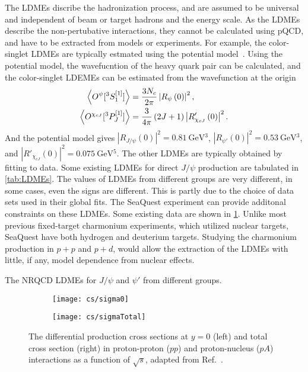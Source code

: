 \documentclass[../main.tex]{subfiles}
\begin{document}
The LDMEs discribe the hadronization process,
and are assumed to be universal and independent of beam or target hadrons and the energy scale.
As the LDMEs describe the non-pertubative interactions,
they cannot be calculated using pQCD, and have to be extracted from models or experiments.
For example, the color-singlet LDMEs are typically estmated using the potential model~\cite{eichten1995}.
Using the potential model, the wavefucntion of the heavy quark pair can be calculated, 
and the color-singlet LDEMEs can be estimated from the wavefunction at the origin
\begin{equation}
	\begin{split}
		\expval{O^{\psi}[^3S_1^{\left[1\right]}]} &= \frac{3N_c}{2\pi} \left| R_{\psi}\left(0\right)\right|^2,\\
		\expval{O^{\chi_{cJ}}[^3P_J^{\left[1\right]}]} &= \frac{3}{4\pi}\left(2J+1\right) \left| R'_{\chi_{cJ}}\left(0\right)\right|^2.
	\end{split}
\end{equation}
And the potential model gives $\left|R_{J/\psi}\left(0\right)\right|^2=\SI{0.81}{\GeV^3}$,
$\left|R_{\psi'}\left(0\right)\right|^2=\SI{0.53}{\GeV^3}$, and $\left|R'_{\chi_{cJ}}\left(0\right)\right|^2=\SI{0.075}{\GeV^5}$.
The other LDMEs are typically obtained by fitting to data.
Some existing LDMEs for direct $J/\psi$ production are tabulated in \cref{tab:LDMEs}.
The values of LDMEs from different groups are very different, in some cases, even the signs are different.
This is partly due to the choice of data sets used in their global fits. The
SeaQuest experiment can provide additonal constraints on these LDMEs. Some
existing data are shown in \cref{fig:charm_cs}.
Unlike most previous fixed-target charmonium experiments, which utilized nuclear
targets, SeaQuest have both hydrogen and deuterium targets.
Studying the charmonium production in $p+p$ and $p+d$, would allow the extraction
of the LDMEs with little, if any, model dependence from nuclear effects.

\begin{table}[ht!]
	\centering
	\caption{The NRQCD LDMEs for $J/\psi$ and $\psi'$ from different groups.}
	\label{tab:LDMEs}
	\scalebox{0.81}{
		
	}
\end{table}

\begin{figure}[ht!]
	\centering
	\begin{subfigure}{0.48\linewidth}
		\texttt{[image: cs/sigma0]}
	\end{subfigure}
	\begin{subfigure}{0.48\linewidth}
		\texttt{[image: cs/sigmaTotal]}
	\end{subfigure}
	\caption{The differential production cross sections at $y=0$ (left) and total
		cross section (right) in proton-proton ($pp$) and proton-nucleus ($pA$) interactions
		as a function of $\sqrt{s}$, adapted from Ref.~\cite{maltoni2006}.}
	\label{fig:charm_cs}
\end{figure}
\end{document}
